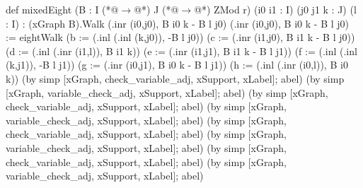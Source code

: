 def mixedEight (B : I (*@$\to$@*) J (*@$\to$@*) ZMod r) (i0 i1 : I) (j0 j1 k : J) (l : I) :
    (xGraph B).Walk (.inr (i0,j0), B i0 k - B l j0)
      (.inr (i0,j0), B i0 k - B l j0) :=
  eightWalk
    (b := (.inl (.inl (k,j0)), -B l j0))
    (c := (.inr (i1,j0), B i1 k - B l j0))
    (d := (.inl (.inr (i1,l)), B i1 k))
    (e := (.inr (i1,j1), B i1 k - B l j1))
    (f := (.inl (.inl (k,j1)), -B l j1))
    (g := (.inr (i0,j1), B i0 k - B l j1))
    (h := (.inl (.inr (i0,l)), B i0 k))
    (by simp [xGraph, check_variable_adj, xSupport, xLabel]; abel)
    (by simp [xGraph, variable_check_adj, xSupport, xLabel]; abel)
    (by simp [xGraph, check_variable_adj, xSupport, xLabel]; abel)
    (by simp [xGraph, variable_check_adj, xSupport, xLabel]; abel)
    (by simp [xGraph, check_variable_adj, xSupport, xLabel]; abel)
    (by simp [xGraph, variable_check_adj, xSupport, xLabel]; abel)
    (by simp [xGraph, check_variable_adj, xSupport, xLabel]; abel)
    (by simp [xGraph, variable_check_adj, xSupport, xLabel]; abel)
